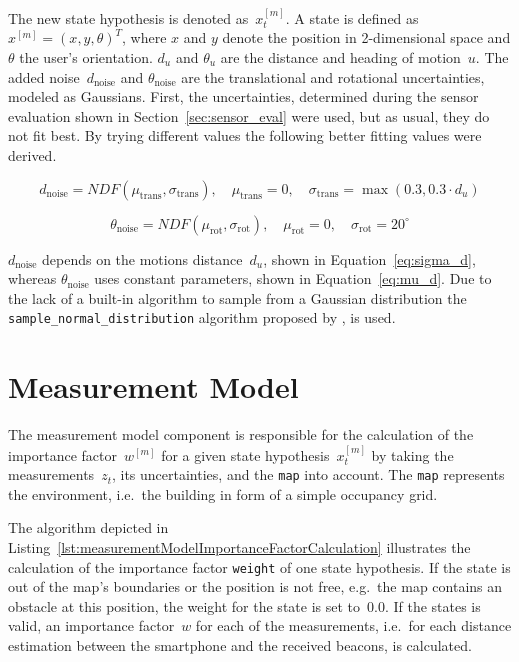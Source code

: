 \noindent The new state hypothesis is denoted as~$x^{[m]}_t$. A state is defined as~$x^{[m]} = (x, y, \theta)^T$, where $x$ and $y$ denote the position in 2-dimensional space and $\theta$ the user's orientation. $d_u$ and $\theta_u$ are the distance and heading of motion~$u$. The added noise~$d_\text{noise}$ and $\theta_\text{noise}$ are the translational and rotational uncertainties, modeled as Gaussians. First, the uncertainties, determined during the sensor evaluation shown in Section~\ref{sec:sensor_eval} were used, but as usual, they do not fit best. By trying different values the following better fitting values were derived.

\begin{equation}\label{eq:sigma_d}
	d_\text{noise} = NDF(\mu_\text{trans}, \sigma_\text{trans}) ,
	\quad \mu_\text{trans} = 0 ,
	 \quad \sigma_{\text{trans}} = \max(0.3, 0.3 \cdot d_u)
\end{equation}

\begin{equation}\label{eq:mu_d}
	\theta_\text{noise} = NDF(\mu_\text{rot}, \sigma_\text{rot}), \quad
	\mu_\text{rot} = 0 , \quad
	\sigma_\text{rot} = 20^{\circ}
\end{equation}

\noindent $d_\text{noise}$ depends on the motions distance~$d_u$, shown in Equation~\ref{eq:sigma_d}, whereas $\theta_\text{noise}$ uses constant parameters, shown in Equation~\ref{eq:mu_d}. Due to the lack of a built-in algorithm to sample from a Gaussian distribution the \texttt{sample\_normal\_distribution} algorithm proposed by \citet[p.~124]{thrun:prob_robo}, is used.


\section{Measurement Model}\label{sec:algo_measurement_model}
The measurement model component is responsible for the calculation of the importance factor~$w^{[m]}$ for a given state hypothesis~$x^{[m]}_t$ by taking the measurements~$z_t$, its uncertainties, and the \texttt{map} into account. The \texttt{map} represents the environment, i.e.\ the building in form of a simple occupancy grid.

The algorithm depicted in Listing~\ref{lst:measurementModelImportanceFactorCalculation} illustrates the calculation of the importance factor \texttt{weight} of one state hypothesis. If the state is out of the map's boundaries or the position is not free, e.g.\ the map contains an obstacle at this position, the weight for the state is set to~0.0. If the states is valid, an importance factor~$w$ for each of the measurements, i.e.\ for each distance estimation between the smartphone and the received beacons, is calculated.

